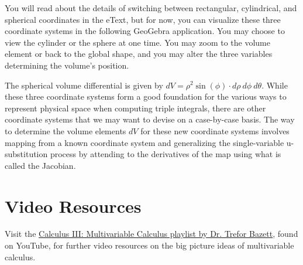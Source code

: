 \documentclass{ximera}
\begin{document}
You will read about the details of switching between rectangular, cylindrical, and spherical coordinates in the eText, but for now, you can visualize these three coordinate systems in the following GeoGebra application. You may choose to view the cylinder or the sphere at one time. You may zoom to the volume element or back to the global shape, and you may alter the three variables determining the volume's position.

\begin{center}
\end{center}

The spherical volume differential is given by $dV=\rho^2\sin(\phi)\cdot d\rho\ d\phi\ d\theta$. While these three coordinate systems form a good foundation for the various ways to represent physical space when computing triple integrals, there are other coordinate systems that we may want to devise on a case-by-case basis. The way to determine the volume elements $dV$ for these new coordinate systems involves mapping from a known coordinate system and generalizing the single-variable u-substitution process by attending to the derivatives of the map using what is called the Jacobian.


\section{Video Resources}


Visit the \href{https://www.youtube.com/playlist?list=PLHXZ9OQGMqxc_CvEy7xBKRQr6I214QJcd}{Calculus III: Multivariable Calculus playlist by Dr. Trefor Bazett}, found on YouTube, for further video resources on the big picture ideas of multivariable calculus.
\end{document}
